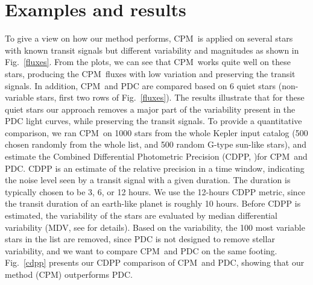 \documentclass[12pt, preprint]{aastex}
\newcommand{\name}{CPM}
\begin{document}
\clearpage

\section{Examples and results}

To give a view on how our method performs, \name\ is applied on several stars with 
known transit signals but different variability and magnitudes as shown in Fig.~\ref{fluxes}. 
From the plots, we can see that \name\ works quite well on these stars, producing the \name\ fluxes 
with low variation and preserving the transit signals.
In addition, \name\ and PDC are compared based on 6 quiet stars 
(non-variable stars, first two rows of Fig.~\ref{fluxes}). 
The results illustrate that for these quiet stars our approach removes 
a major part of the variability present in the PDC light curves, while preserving the transit signals. 
To provide a quantitative comparison, we ran \name\ on 1000 stars from the whole Kepler input catalog 
(500 chosen randomly from the whole list, and 500 random G-type sun-like stars), 
and estimate the Combined Differential Photometric Precision (CDPP,  \cite{cdpp1} )for \name\ and PDC. 
CDPP is an estimate of the relative precision in a time window, 
indicating the noise level seen by a transit signal with a given duration. 
The duration is typically chosen to be 3, 6, or 12 hours. 
We use the 12-hours CDPP metric, since the transit duration of an earth-like planet is roughly 10 hours. 
Before CDPP is estimated, the variability of the stars are evaluated by median differential variability 
  (MDV, see \cite{basri2013} for details). 
Based on the variability, the 100 most variable stars in the list are removed, 
  since PDC is not designed to remove stellar variability, 
  and we want to compare \name\ and PDC on the same footing.
Fig.~\ref{cdpp} presents our CDPP comparison of \name\ and PDC, 
  showing that our method (\name) outperforms PDC. 
\end{document}
